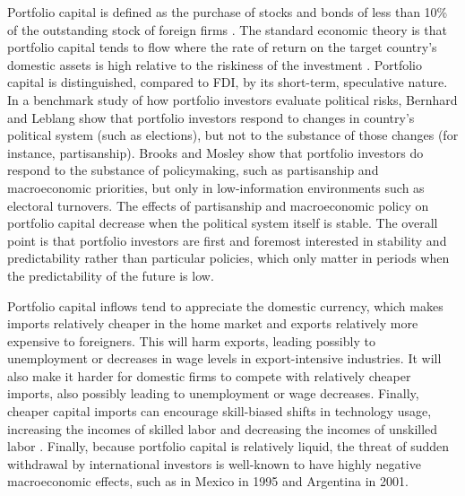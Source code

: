 \documentclass[12pt,a4paper]{article}\usepackage[]{graphicx}\usepackage[]{color}
\begin{document}
Portfolio capital is defined as the purchase of stocks and bonds of less than 10\% of the outstanding stock of foreign firms \parencites{kenen1994exchange}{Walther:1997wf}. The standard economic theory is that portfolio capital tends to flow where the rate of return on the target country's domestic assets is high relative to the riskiness of the investment \parencites[743]{mosley2003global}[685]{ISQU:ISQU420}. Portfolio capital is distinguished, compared to FDI, by its short-term, speculative nature. In a benchmark study of how portfolio investors evaluate political risks, Bernhard and Leblang \parencite*{Bernhard:2003kb} show that portfolio investors respond to changes in country's political system (such as elections), but not to the substance of those changes (for instance, partisanship). Brooks and Mosley \parencite*{Brooks:2007we} show that portfolio investors do respond to the substance of policymaking, such as partisanship and macroeconomic priorities, but only in low-information environments such as electoral turnovers. The effects of partisanship and macroeconomic policy on portfolio capital decrease when the political system itself is stable. The overall point is that portfolio investors are first and foremost interested in stability and predictability rather than particular policies, which only matter in periods when the predictability of the future is low.

Portfolio capital inflows tend to appreciate the domestic currency, which makes imports relatively cheaper in the home market and exports relatively more expensive to foreigners. This will harm exports, leading possibly to unemployment or decreases in wage levels in export-intensive industries. It will also make it harder for domestic firms to compete with relatively cheaper imports, also possibly leading to unemployment or wage decreases. Finally, cheaper capital imports can encourage skill-biased shifts in technology usage, increasing the incomes of skilled labor and decreasing the incomes of unskilled labor \parencites{Cragg:1996iy}{Ros:2000vy}. Finally, because portfolio capital is relatively liquid, the threat of sudden withdrawal by international investors is well-known to have highly negative macroeconomic effects, such as in Mexico in 1995 and Argentina in 2001.
\end{document}
